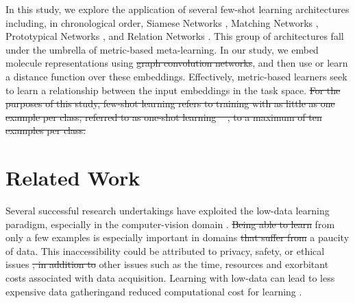 \documentclass[journal=jcisd8,manuscript=article]{achemso} %
\providecommand{\DIFadd}[1]{{\protect\color{blue}\uwave{#1}}} %
\providecommand{\DIFdel}[1]{{\protect\color{red}\sout{#1}}}                      %
\providecommand{\DIFaddbegin}{} %
\providecommand{\DIFaddend}{} %
\providecommand{\DIFdelbegin}{} %
\providecommand{\DIFdelend}{} %
\begin{document}
In this study, we explore the application of several few-shot learning architectures including, in chronological order, Siamese Networks \citep{koch2015siamese}, Matching Networks \citep{vinyals2016matching}, Prototypical Networks \citep{snell2017prototypical}, and Relation Networks \citep{sung2018learning}. This group of architectures \DIFaddbegin \DIFadd{all }\DIFaddend fall under the umbrella of metric-based meta-learning. In our study, we embed molecule representations using \DIFdelbegin \DIFdel{graph convolution networks}\DIFdelend \DIFaddbegin \DIFadd{GCNs}\DIFaddend , and then use or learn a distance function over these embeddings. Effectively, metric-based learners seek to learn a relationship between the input embeddings in the task space. 
\DIFdelbegin \DIFdel{For the purposes of this study, few-shot learning refers to training with as little as one example per class, referred to as one-shot learning \mbox{%
\cite{koch2015siamese, vinyals2016matching}}\hspace{0pt}%
, to a maximum of ten examples per class. 
}\DIFdelend 

\section{Related Work}

Several successful research undertakings have exploited the low-data learning paradigm, especially in the computer-vision domain \cite{koch2015siamese, vinyals2016matching, snell2017prototypical, sung2018learning}. \DIFdelbegin \DIFdel{Being able to learn }\DIFdelend \DIFaddbegin \DIFadd{Learning }\DIFaddend from only a few examples is especially important in domains \DIFdelbegin \DIFdel{that suffer from }\DIFdelend \DIFaddbegin \DIFadd{with }\DIFaddend a paucity of data. This inaccessibility could be attributed to privacy, safety, or ethical issues \DIFdelbegin \DIFdel{, in addition to }\DIFdelend \DIFaddbegin \DIFadd{and }\DIFaddend other issues such as the time, resources and exorbitant costs associated with data acquisition. Learning with low-data can lead to less expensive data gathering\DIFaddbegin \DIFadd{, }\DIFaddend and reduced computational cost for learning \cite{wang2020generalizing}.
\end{document}

